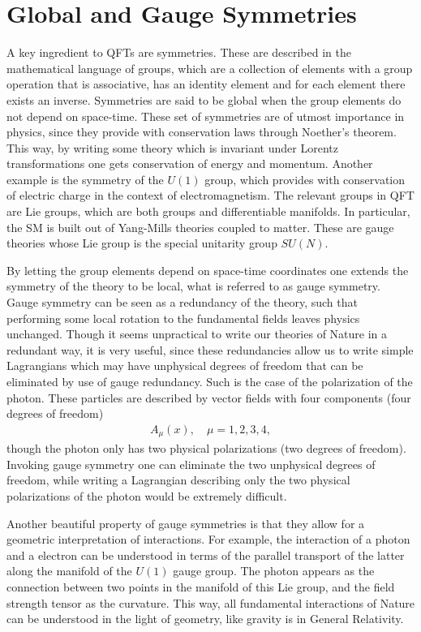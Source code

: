 \section*{Global and Gauge Symmetries}

A key ingredient to QFTs are symmetries. These are described in the mathematical language of groups, which are a collection of elements with a group operation that is associative, has an identity element and for each element there exists an inverse. Symmetries are said to be global when the group elements do not depend on space-time. These set of symmetries are of utmost importance in physics, since they provide with conservation laws through Noether's theorem. This way, by writing some theory which is invariant under Lorentz transformations one gets conservation of energy and momentum. Another example is the symmetry of the $U(1)$ group, which provides with conservation of electric charge in the context of electromagnetism. The relevant groups in QFT are Lie groups, which are both groups and differentiable manifolds. In particular, the SM is built out of Yang-Mills theories coupled to matter. These are gauge theories whose Lie group is the special unitarity group $SU(N)$.

By letting the group elements depend on space-time coordinates one extends the symmetry of the theory to be local, what is referred to as gauge symmetry. Gauge symmetry can be seen as a redundancy of the theory, such that performing some local rotation to the fundamental fields leaves physics unchanged. Though it seems unpractical to write our theories of Nature in a redundant way, it is very useful, since these redundancies allow us to write simple Lagrangians which may have unphysical degrees of freedom that can be eliminated by use of gauge redundancy. Such is the case of the polarization of the photon. These particles are described by vector fields with four components (four degrees of freedom)
\begin{gather}
A_{\mu}(x), \quad \mu=1,2,3,4,
\end{gather}
though the photon only has two physical polarizations (two degrees of freedom). Invoking gauge symmetry one can eliminate the two unphysical degrees of freedom, while writing a Lagrangian describing only the two physical polarizations of the photon would be extremely difficult. 

Another beautiful property of gauge symmetries is that they allow for a geometric interpretation of interactions. For example, the interaction of a photon and a electron can be understood in terms of the parallel transport of the latter along the manifold of the $U(1)$ gauge group. The photon appears as the connection between two points in the manifold of this Lie group, and the field strength tensor as the curvature. This way, all fundamental interactions of Nature can be understood in the light of geometry, like gravity is in General Relativity.

